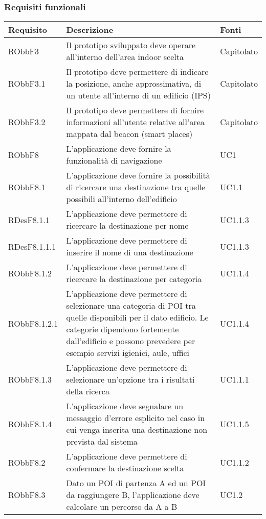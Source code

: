 \documentclass[../AnalisiDeiRequisiti.tex]{subfiles}
\begin{document}
\subsubsection{Requisiti funzionali}
\begin{longtabu} to \textwidth {X X[2] X}
	\toprule
	\textbf{Requisito} & \textbf{Descrizione} & \textbf{Fonti}\\
	\midrule
	\endhead
	RObbF3 & Il prototipo sviluppato deve operare all'interno dell'area indoor scelta & Capitolato \\ 
	\midrule 
	RObbF3.1 & Il prototipo deve permettere di indicare la posizione, anche approssimativa, di un utente all'interno di un edificio (IPS) & Capitolato \\ 
	\midrule 
	RObbF3.2 & Il prototipo deve permettere di fornire informazioni all'utente relative all'area mappata dal beacon (smart places) & Capitolato \\ 
	\midrule 
	RObbF8 & L'applicazione deve fornire la funzionalità di navigazione & UC1 \\ 
	\midrule 
	RObbF8.1 & L'applicazione deve fornire la possibilità di ricercare una destinazione tra quelle possibili all'interno dell'edificio & UC1.1 \\ 
	\midrule 
	RDesF8.1.1 & L'applicazione deve permettere di ricercare la destinazione per nome & UC1.1.3 \\ 
	\midrule 
	RDesF8.1.1.1 & L'applicazione deve permettere di inserire il nome di una destinazione & UC1.1.3 \\ 
	\midrule 
	RObbF8.1.2 & L'applicazione deve permettere di ricercare la destinazione per categoria & UC1.1.4 \\ 
	\midrule 
	RObbF8.1.2.1 & L'applicazione deve permettere di selezionare una categoria di POI tra quelle disponibili per il dato edificio. Le categorie dipendono fortemente dall'edificio e possono prevedere per esempio servizi igienici, aule, uffici & UC1.1.4 \\ 
	\midrule 
	RObbF8.1.3 & L'applicazione deve permettere di selezionare un'opzione tra i risultati della ricerca & UC1.1.1 \\ 
	\midrule 
	RObbF8.1.4 & L'applicazione deve segnalare un messaggio d'errore esplicito nel caso in cui venga inserita una destinazione non prevista dal sistema & UC1.1.5 \\ 
	\midrule 
	RObbF8.2 & L'applicazione deve permettere di confermare la destinazione scelta & UC1.1.2 \\ 
	\midrule 
	RObbF8.3 & Dato un POI di partenza A ed un POI da raggiungere B, l'applicazione deve calcolare un percorso da A a B & UC1.2 \\ 

\end{longtabu}
\end{document}
